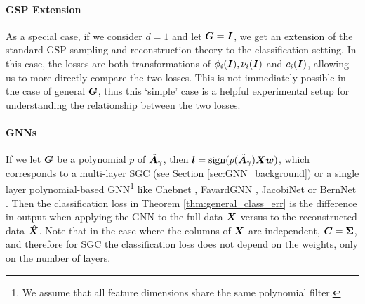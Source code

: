 \paragraph{GSP Extension}As a special case, if we consider $d=1$ and let  $\bm{G} = \bm{I}$, we get an extension of the standard GSP sampling and reconstruction theory to the classification setting. In this case, the losses are both transformations of $\phi_{i}(\bm{I}), \nu_{i}(\bm{I})$ and $c_{i}(\bm{I})$, allowing us to more directly compare the two losses. This is not immediately possible in the case of general $\bm{G}${, thus this `simple' case is a helpful experimental setup for understanding the relationship between the two losses.}

\paragraph{GNNs} If we let $\bm{G}$ be a polynomial $p$ of $\tilde{\bm{A}}_{\gamma}$, then $\bm{l} = \text{sign}(p(\tilde{\bm{A}}_{\gamma})\bm{X}\bm{w})$, which corresponds to a multi-layer SGC \cite{wu2019simplifying} (see Section \ref{sec:GNN_background}) or a single layer polynomial-based GNN\footnote{We assume that all feature dimensions share the same polynomial filter.} like Chebnet \cite{defferrard2016convolutional}, FavardGNN \cite{guo2023Favard}, JacobiNet \cite{guo2023manipulating} or BernNet \cite{he2021bernnet}. Then the classification loss in Theorem \ref{thm:general_class_err} is the difference in output when applying the GNN to the full data $\bm{X}$ versus to the reconstructed data $\hat{\bm{X}}$. Note that in the case where the columns of $\bm{X}$ are independent, $\bm{C} = \bm{\Sigma}$, and therefore for SGC the classification loss does not depend on the weights, only on the number of layers. 






